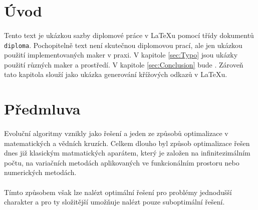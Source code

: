 \documentclass[bc,male,java,dept460]{diploma}		%
\begin{document}
\MakeTitlePages

\tableofcontents
\cleardoublepage	%

\listoftables
\cleardoublepage	%

\listoffigures
\cleardoublepage	%

\lstlistoflistings
\cleardoublepage	%

\section{Úvod}
\label{sec:Uvod}
\paragraph*{}
Tento text je ukázkou sazby diplomové práce v \LaTeX{}u pomocí třídy dokumentů \verb|diploma|.
Pochopitelně text není skutečnou diplomovou prací, ale jen ukázkou použití
implementovaných maker v praxi. V kapitole \ref{sec:Typo} jsou ukázky použití
různých maker a prostředí. V kapitole \ref{sec:Conclusion} bude . Zároveň tato kapitola slouží jako ukázka generování křížových odkazů v \LaTeX{}u.

\section{Předmluva}
\label{sec:Predmluva}
\paragraph*{}
Evoluční algoritmy vznikly jako řešení a jeden ze způsobů optimalizace v matematických a vědních kruzích. Celkem dlouho byl způsob optimalizace řešen dnes již klasickým matmatických aparátem, který je založen na infinitezimálním počtu, na variačních metodách aplikovaných ve funkcionálním prostoru nebo numerických metodách.

\paragraph*{}
Tímto způsobem však lze nalézt optimální řešení pro problémy jednodušší charakter a pro ty složitější umožňuje nalézt pouze suboptimální řešení.
\end{document}
